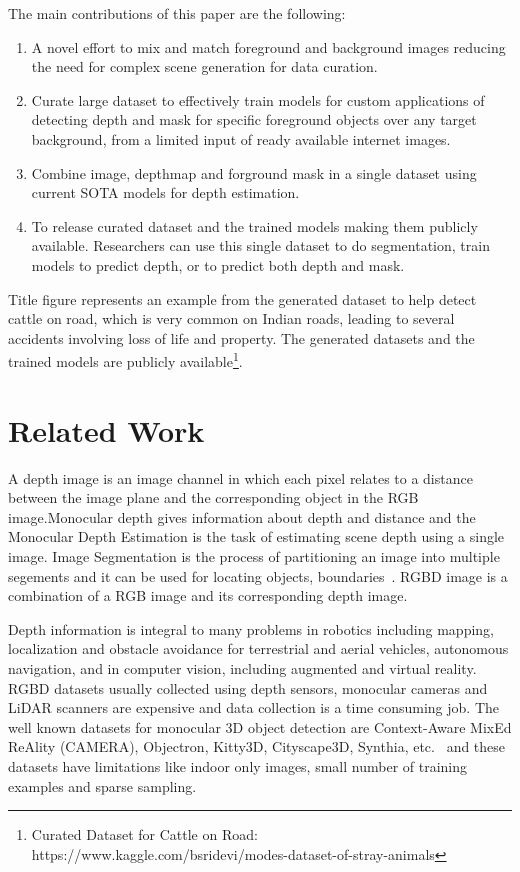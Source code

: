 \documentclass[review]{cvpr}
\begin{document}
The main contributions of this paper are the following:
\begin{enumerate}
\item A novel effort to mix and match foreground and background images reducing the need for complex scene generation for data curation.
\item Curate large dataset to effectively train models for custom applications of detecting depth and mask for specific foreground objects over any target background, from a limited input of ready available internet images.
\item Combine image, depthmap and forground mask in a single dataset using current SOTA models for depth estimation.
\item To release curated dataset and the trained models making them publicly available. Researchers can use this single dataset to do segmentation, train models to predict depth, or to predict both depth and mask.
\end{enumerate}
  

Title figure represents an example from the generated dataset to help detect cattle on road,  which is very common on Indian roads, leading to several accidents involving loss of life and property. The generated datasets and the trained models are publicly available\footnote{Curated Dataset for Cattle on Road: https://www.kaggle.com/bsridevi/modes-dataset-of-stray-animals}.


\section {Related Work}

A depth image is an image channel in which each pixel relates to a distance between the image plane and the corresponding object in the RGB image.Monocular depth gives information about depth and distance and the Monocular Depth Estimation is the task of estimating scene depth using a single image\cite{abuolaim2020defocus}. Image Segmentation is the process of partitioning an image into multiple segements and it can be used for locating objects, boundaries~\cite{amza2012review}. RGBD image is a combination of a RGB image and its corresponding depth image\cite{zhang2018deep}.
 
Depth information is integral to many problems in robotics including mapping, localization and obstacle avoidance for terrestrial and aerial vehicles, autonomous navigation, and in computer vision, including augmented and virtual reality\cite{marchand2015pose}. RGBD datasets usually collected using depth sensors, monocular cameras and LiDAR scanners are expensive and data collection is a time consuming job. The well known datasets for monocular 3D object detection are Context-Aware MixEd ReAlity (CAMERA), Objectron, Kitty3D, Cityscape3D, Synthia, etc.~\cite{} and these datasets have limitations like indoor only images, small number of training examples and sparse sampling. 
 
\end{document}
